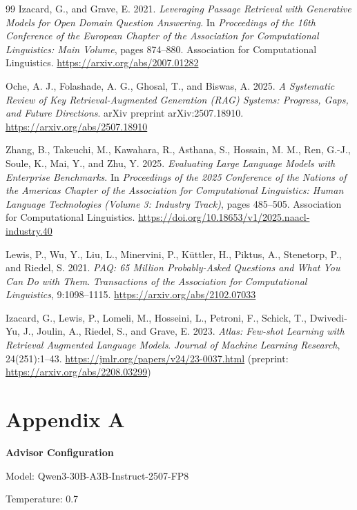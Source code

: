 \documentclass[11pt]{article}
\begin{document}
\begin{thebibliography}{99}
Izacard, G., and Grave, E. 2021. \emph{Leveraging Passage Retrieval with Generative Models for Open Domain Question Answering}. In \emph{Proceedings of the 16th Conference of the European Chapter of the Association for Computational Linguistics: Main Volume}, pages 874--880. Association for Computational Linguistics. \url{https://arxiv.org/abs/2007.01282}

Oche, A. J., Folashade, A. G., Ghosal, T., and Biswas, A. 2025. \emph{A Systematic Review of Key Retrieval-Augmented Generation (RAG) Systems: Progress, Gaps, and Future Directions}. arXiv preprint arXiv:2507.18910. \url{https://arxiv.org/abs/2507.18910}

Zhang, B., Takeuchi, M., Kawahara, R., Asthana, S., Hossain, M. M., Ren, G.-J., Soule, K., Mai, Y., and Zhu, Y. 2025. \emph{Evaluating Large Language Models with Enterprise Benchmarks}. In \emph{Proceedings of the 2025 Conference of the Nations of the Americas Chapter of the Association for Computational Linguistics: Human Language Technologies (Volume 3: Industry Track)}, pages 485--505. Association for Computational Linguistics. \url{https://doi.org/10.18653/v1/2025.naacl-industry.40}

Lewis, P., Wu, Y., Liu, L., Minervini, P., Küttler, H., Piktus, A., Stenetorp, P., and Riedel, S. 2021. \emph{PAQ: 65 Million Probably-Asked Questions and What You Can Do with Them}. \emph{Transactions of the Association for Computational Linguistics}, 9:1098--1115. \url{https://arxiv.org/abs/2102.07033}

Izacard, G., Lewis, P., Lomeli, M., Hosseini, L., Petroni, F., Schick, T., Dwivedi-Yu, J., Joulin, A., Riedel, S., and Grave, E. 2023. \emph{Atlas: Few-shot Learning with Retrieval Augmented Language Models}. \emph{Journal of Machine Learning Research}, 24(251):1--43. \url{https://jmlr.org/papers/v24/23-0037.html} (preprint: \url{https://arxiv.org/abs/2208.03299})

\end{thebibliography}

\appendix
\section{Appendix A}

\textbf{Advisor Configuration}

Model: Qwen3-30B-A3B-Instruct-2507-FP8

Temperature: 0.7
\end{document}
